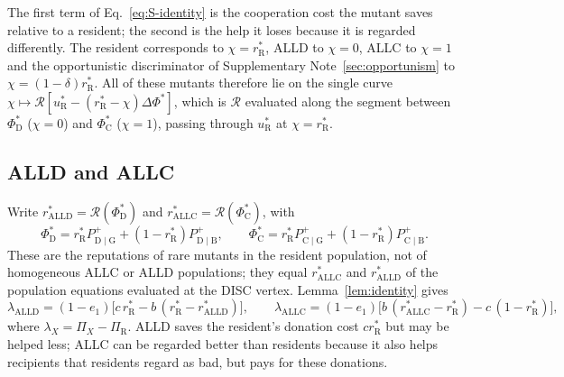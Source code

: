 \documentclass[fleqn,10pt]{article}
\theoremstyle{plain}
\theoremstyle{remark}
\newcommand{\Rm}{\mathcal R}
\newcommand{\C}{\mathrm C}
\newcommand{\D}{\mathrm D}
\newcommand{\ALLC}{\mathrm{ALLC}}
\newcommand{\ALLD}{\mathrm{ALLD}}
\newcommand{\Pp}[2]{P^+_{\mathrm{#1}\mid\mathrm{#2}}}
\newcommand{\rR}{r^*_{\mathrm R}}
\newcommand{\uR}{u^*_{\mathrm R}}
\begin{document}
The first term of Eq.~\eqref{eq:S-identity} is the cooperation cost the mutant
saves relative to a resident; the second is the help it loses because it is
regarded differently. The resident corresponds to $\chi=\rR$, ALLD to
$\chi=0$, ALLC to $\chi=1$ and the opportunistic discriminator of
Supplementary Note~\ref{sec:opportunism} to $\chi=(1-\delta)\rR$. All of these
mutants therefore lie on the single curve
$\chi\mapsto\Rm[\uR-(\rR-\chi)\Delta\Phi^*]$, which is $\Rm$ evaluated along the
segment between $\Phi^*_\D$ ($\chi=0$) and $\Phi^*_\C$ ($\chi=1$), passing
through $\uR$ at $\chi=\rR$.

\subsection{ALLD and ALLC}
Write $r^*_{\ALLD}=\Rm(\Phi^*_\D)$ and $r^*_{\ALLC}=\Rm(\Phi^*_\C)$, with
\begin{equation}
\Phi^*_\D=\rR\Pp DG+(1-\rR)\Pp DB,\qquad
\Phi^*_\C=\rR\Pp CG+(1-\rR)\Pp CB .
\label{eq:S-PhiStar}
\end{equation}
These are the reputations of rare mutants in the resident population, not of
homogeneous ALLC or ALLD populations; they equal $r^*_{\ALLC}$ and $r^*_{\ALLD}$
of the population equations evaluated at the DISC vertex. Lemma~\ref{lem:identity}
gives
\begin{equation}
\lambda_{\ALLD}=(1-e_1)\bigl[c\,\rR-b\,(\rR-r^*_{\ALLD})\bigr],\qquad
\lambda_{\ALLC}=(1-e_1)\bigl[b\,(r^*_{\ALLC}-\rR)-c\,(1-\rR)\bigr],
\label{eq:S-lambda}
\end{equation}
where $\lambda_X=\Pi_X-\Pi_{\mathrm R}$. ALLD saves the resident's donation cost
$c\rR$ but may be helped less; ALLC can be regarded better than residents because
it also helps recipients that residents regard as bad, but pays for these
donations.
\end{document}
